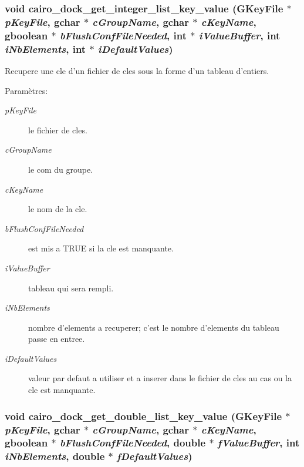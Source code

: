 \subsubsection{\setlength{\rightskip}{0pt plus 5cm}void cairo\_\-dock\_\-get\_\-integer\_\-list\_\-key\_\-value (GKey\-File $\ast$ {\em p\-Key\-File}, gchar $\ast$ {\em c\-Group\-Name}, gchar $\ast$ {\em c\-Key\-Name}, gboolean $\ast$ {\em b\-Flush\-Conf\-File\-Needed}, int $\ast$ {\em i\-Value\-Buffer}, int {\em i\-Nb\-Elements}, int $\ast$ {\em i\-Default\-Values})}\label{cairo-dock-config_8c_b12b7c7f51c703b3c16c90b00b83acbd}


Recupere une cle d'un fichier de cles sous la forme d'un tableau d'entiers. \begin{Desc}
\item[Param\`{e}tres:]
\begin{description}
\item[{\em p\-Key\-File}]le fichier de cles. \item[{\em c\-Group\-Name}]le com du groupe. \item[{\em c\-Key\-Name}]le nom de la cle. \item[{\em b\-Flush\-Conf\-File\-Needed}]est mis a TRUE si la cle est manquante. \item[{\em i\-Value\-Buffer}]tableau qui sera rempli. \item[{\em i\-Nb\-Elements}]nombre d'elements a recuperer; c'est le nombre d'elements du tableau passe en entree. \item[{\em i\-Default\-Values}]valeur par defaut a utiliser et a inserer dans le fichier de cles au cas ou la cle est manquante. \end{description}
\end{Desc}
\subsubsection{\setlength{\rightskip}{0pt plus 5cm}void cairo\_\-dock\_\-get\_\-double\_\-list\_\-key\_\-value (GKey\-File $\ast$ {\em p\-Key\-File}, gchar $\ast$ {\em c\-Group\-Name}, gchar $\ast$ {\em c\-Key\-Name}, gboolean $\ast$ {\em b\-Flush\-Conf\-File\-Needed}, double $\ast$ {\em f\-Value\-Buffer}, int {\em i\-Nb\-Elements}, double $\ast$ {\em f\-Default\-Values})}\label{cairo-dock-config_8c_1cc7cb88d1fb657678fe728e648db8be}


